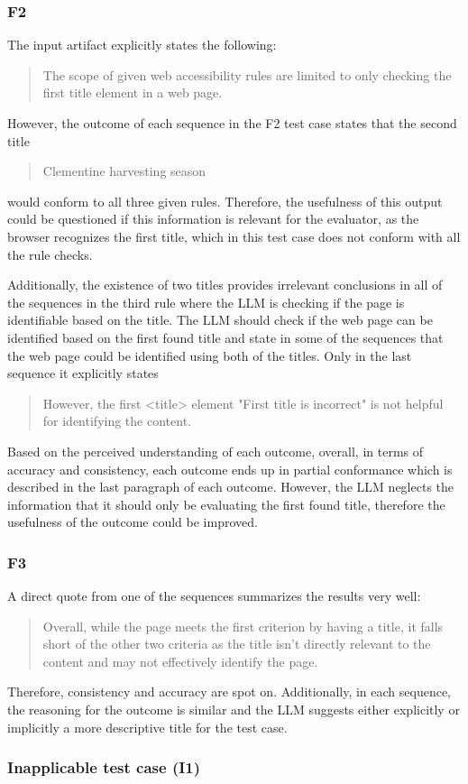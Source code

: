 \subsubsection{F2}

The input artifact explicitly states the following: \blockquote{The scope of given web accessibility rules are limited to only checking the first title element in a web page.}. However, the outcome of each sequence in the F2 test case states that the second title \blockquote{Clementine harvesting season} would conform to all three given rules. Therefore, the usefulness of this output could be questioned if this information is relevant for the evaluator, as the browser recognizes the first title, which in this test case does not conform with all the rule checks.

Additionally, the existence of two titles provides irrelevant conclusions in all of the sequences in the third rule where the LLM is checking if the page is identifiable based on the title. The LLM should check if the web page can be identified based on the first found title and state in some of the sequences that the web page could be identified using both of the titles. Only in the last sequence it explicitly states \blockquote{However, the first <title> element "First title is incorrect" is not helpful for identifying the content.}

Based on the perceived understanding of each outcome, overall, in terms of accuracy and consistency, each outcome ends up in partial conformance which is described in the last paragraph of each outcome. However, the LLM neglects the information that it should only be evaluating the first found title, therefore the usefulness of the outcome could be improved.

\subsubsection{F3}

A direct quote from one of the sequences summarizes the results very well: \blockquote{Overall, while the page meets the first criterion by having a title, it falls short of the other two criteria as the title isn't directly relevant to the content and may not effectively identify the page.}. Therefore, consistency and accuracy are spot on. Additionally, in each sequence, the reasoning for the outcome is similar and the LLM suggests either explicitly or implicitly a more descriptive title for the test case.

\subsubsection{Inapplicable test case (I1)}

